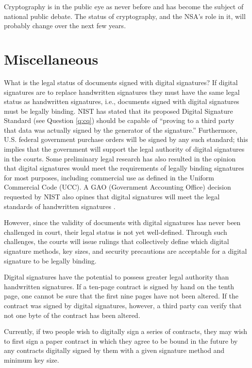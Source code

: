Cryptography is in the public eye as never before and has become the subject
of national public debate. The status of cryptography, and the NSA's role
in it, will probably change over the next few years.

\section {Miscellaneous}
{What is the legal status of documents signed with digital signatures?}
If digital signatures are to replace handwritten signatures they must have 
the same legal status as handwritten signatures, i.e., documents signed with 
digital signatures must be legally binding. NIST has stated that its 
proposed Digital Signature Standard (see Question \ref{q:cq}) should be 
capable of ``proving to a third party that data was actually signed by the 
generator of the signature.'' Furthermore, U.S. federal government
purchase orders will be signed by any such standard; this implies that
the government will support the legal authority of digital signatures
in the courts. Some preliminary legal research has also resulted in the
opinion that digital signatures would meet the requirements of legally
binding signatures for most purposes, including commercial use as defined 
in the Uniform Commercial Code (UCC). A GAO (Government Accounting
Office) decision requested by NIST also opines that digital signatures
will meet the legal standards of handwritten signatures 
\cite{comp-gao-edi}.

However, since the validity of documents with digital signatures has never 
been challenged in court, their legal status is not yet well-defined.
Through such challenges, the courts will issue rulings that collectively 
define which digital signature methods, key sizes, and security precautions 
are acceptable for a digital signature to be legally binding.

Digital signatures have the potential to possess greater legal authority
than handwritten signatures. If a ten-page contract is signed by hand on
the tenth page, one cannot be sure that the first nine pages have not
been altered. If the contract was signed by digital signatures, however, 
a third party can verify that not one byte of the contract has been altered.

Currently, if two people wish to digitally sign a series of contracts, 
they may wish to first sign a paper contract in which they agree to be bound 
in the future by any contracts digitally signed by them with a given 
signature method and minimum key size.

